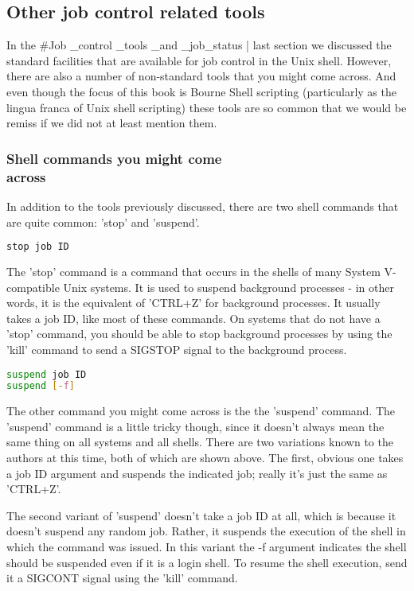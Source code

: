 \subsection{Other job control related tools}
In the \#Job \_control \_tools \_and \_job\_status | last section we discussed
the standard facilities that are available for job control in the Unix shell.
However, there are also a number of non-standard tools that you might come
across. And even though the focus of this book is Bourne Shell scripting
(particularly as the lingua franca of Unix shell scripting) these tools are so
common that we would be remiss if we did not at least mention them.

\subsubsection{Shell commands you might come\\ across}
In addition to the tools previously discussed, there are two shell commands
that are quite common: 'stop' and 'suspend'.
\lstset{basicstyle=\scriptsize, numbers=left, captionpos=b, tabsize=4}
\begin{lstlisting}[language={bash},xleftmargin=15pt]
stop job ID
\end{lstlisting}

The 'stop' command is a command that occurs in the shells of many System
V-compatible Unix systems. It is used to suspend background processes - in
other words, it is the equivalent of 'CTRL+Z' for background processes. It
usually takes a job ID, like most of these commands. On systems that do not
have a 'stop' command, you should be able to stop background processes by using
the 'kill' command to send a SIGSTOP signal to the background process.
\lstset{basicstyle=\scriptsize, numbers=left, captionpos=b, tabsize=4}
\begin{lstlisting}[language={bash},
xleftmargin=15pt]
suspend job ID 
suspend [-f]
\end{lstlisting}

The other command you might come across is the the 'suspend' command. The
'suspend' command is a little tricky though, since it doesn't always mean the
same thing on all systems and all shells. There are two variations known to the
authors at this time, both of which are shown above. The first, obvious one
takes a job ID argument and suspends the indicated job; really it's just the
same as 'CTRL+Z'. 

The second variant of 'suspend' doesn't take a job ID at all, which is because
it doesn't suspend any random job. Rather, it suspends the execution of the
shell in which the command was issued. In this variant the -f argument
indicates the shell should be suspended even if it is a login shell. To resume
the shell execution, send it a SIGCONT signal using the 'kill' command.

